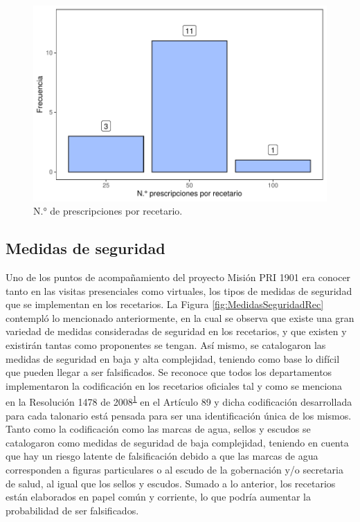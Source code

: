 \documentclass[
  oneside]{book}
\begin{document}
\begin{figure}

{\centering \includegraphics[width=0.85\linewidth]{InformeFinal_files/figure-latex/existenciaRecetarios4-1} 

}

\caption{N.° de prescripciones por recetario.}\label{fig:existenciaRecetarios4}
\end{figure}

\hypertarget{medidas-de-seguridad}{%
\subsection{Medidas de seguridad}\label{medidas-de-seguridad}}

Uno de los puntos de acompañamiento del proyecto Misión PRI 1901 era conocer tanto en las visitas presenciales como virtuales, los tipos de medidas de seguridad que se implementan en los recetarios. La Figura \ref{fig:MedidasSeguridadRec} contempló lo mencionado anteriormente, en la cual se observa que existe una gran variedad de medidas consideradas de seguridad en los recetarios, y que existen y existirán tantas como proponentes se tengan. Así mismo, se catalogaron las medidas de seguridad en baja y alta complejidad, teniendo como base lo difícil que pueden llegar a ser falsificados. Se reconoce que todos los departamentos implementaron la codificación en los recetarios oficiales tal y como se menciona en la Resolución 1478 de 2008\textsuperscript{\protect\hyperlink{ref-MSPS1478-2006}{1}} en el Artículo 89 y dicha codificación desarrollada para cada talonario está pensada para ser una identificación única de los mismos.
Tanto como la codificación como las marcas de agua, sellos y escudos se catalogaron como medidas de seguridad de baja complejidad, teniendo en cuenta que hay un riesgo latente de falsificación debido a que las marcas de agua corresponden a figuras particulares o al escudo de la gobernación y/o secretaria de salud, al igual que los sellos y escudos. Sumado a lo anterior, los recetarios están elaborados en papel común y corriente, lo que podría aumentar la probabilidad de ser falsificados.
\end{document}

